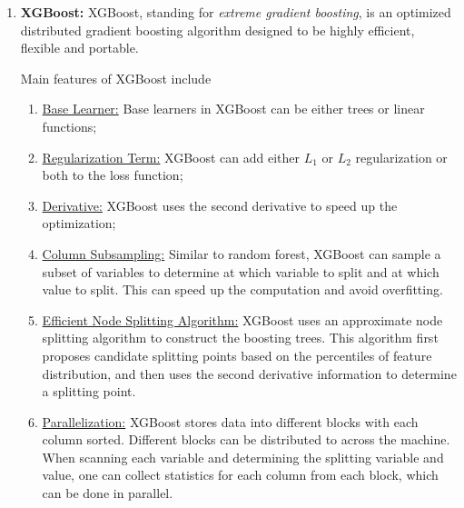 \documentclass[12pt]{article}
\begin{document}
\begin{enumerate}[label=\textbf{\arabic*.}]

	\item \textbf{XGBoost:} XGBoost, standing for \textit{extreme gradient boosting}, is an optimized distributed gradient boosting algorithm designed to be highly efficient, flexible and portable. 
	
	Main features of XGBoost include 
	\begin{enumerate}
		\item \underline{Base Learner:} Base learners in XGBoost can be either trees or linear functions; 
					
		\item \underline{Regularization Term:} XGBoost can add either $L_1$ or $L_2$ regularization or both to the loss function; 
		
		\item \underline{Derivative:} XGBoost uses the second derivative to speed up the optimization; 
		
		\item \underline{Column Subsampling:} Similar to random forest, XGBoost can sample a subset of variables to determine at which variable to split and at which value to split. This can speed up the computation and avoid overfitting. 
		
		\item \underline{Efficient Node Splitting Algorithm:} XGBoost uses an approximate node splitting algorithm to construct the boosting trees. This algorithm first proposes candidate splitting points based on the percentiles of feature distribution, and then uses the second derivative information to determine a splitting point. 
		
		
		\item \underline{Parallelization:} XGBoost stores data into different blocks with each column sorted. Different blocks can be distributed to across the machine. When scanning each variable and determining the splitting variable and value, one can collect statistics for each column from each block, which can be done in parallel. 
	
	\end{enumerate}
	

\end{enumerate}
\end{document}
